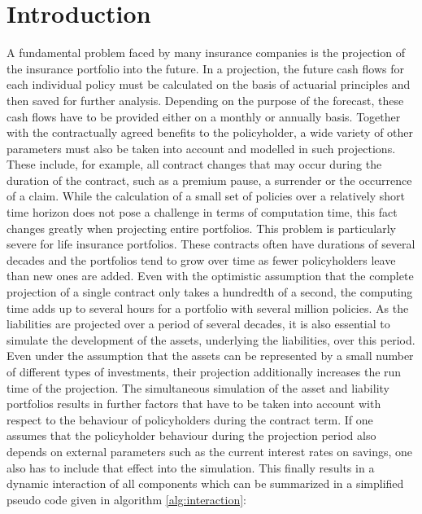 

\chapter{Introduction}
\label{cha:introduction}

A fundamental problem faced by many insurance companies is the projection of the insurance portfolio into the future. In a projection, the future cash flows for each individual policy must be calculated on the basis of actuarial principles and then saved for further analysis. Depending on the purpose of the forecast, these cash flows have to be provided either on a monthly or annually basis. Together with the contractually agreed benefits to the policyholder, a wide variety of other parameters must also be taken into account and modelled in such projections. These include, for example, all contract changes that may occur during the duration of the contract, such as a premium pause, a surrender or the occurrence of a claim. While the calculation of a small set of policies over a relatively short time horizon does not pose a challenge in terms of computation time, this fact changes greatly when projecting entire portfolios. This problem is particularly severe for life insurance portfolios. These contracts often have durations of several decades and the portfolios tend to grow over time as fewer policyholders leave than new ones are added. Even with the optimistic assumption that the complete projection of a single contract only takes a hundredth of a second, the computing time adds up to several hours for a portfolio with several million policies. As the liabilities are projected over a period of several decades, it is also essential to simulate the development of the assets, underlying the liabilities, over this period. Even under the assumption that the assets can be represented by a small number of different types of investments, their projection additionally increases the run time of the projection. The simultaneous simulation of the asset and liability portfolios results in further factors that have to be taken into account with respect to the behaviour of policyholders during the contract term. If one assumes that the policyholder behaviour during the projection period also depends on external parameters such as the current interest rates on savings, one also has to include that effect into the simulation. This finally results in a dynamic interaction of all components which can be summarized in a simplified pseudo code given in algorithm \ref{alg:interaction}:

